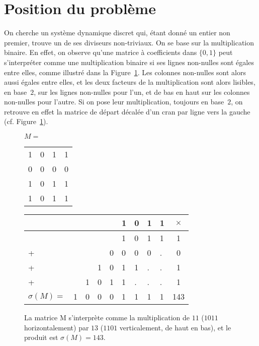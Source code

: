 \section{Position du problème}
\label{sec:introfacto}



On cherche un système dynamique discret qui, étant donné un entier non premier, trouve un de ses diviseurs non-triviaux. On se base sur la multiplication binaire. En effet, on observe qu'une matrice à coefficients dans $\{0,1\}$ peut s'interpréter comme une multiplication binaire si ses lignes non-nulles sont égales entre elles, comme illustré dans la Figure~\ref{fig:ExShift}. Les colonnes non-nulles sont alors aussi égales entre elles, et les deux facteurs de la multiplication sont alors lisibles, en base~$2$, sur les lignes non-nulles pour l'un, et de bas en haut sur les colonnes non-nulles pour l'autre. Si on pose leur multiplication, toujours en base~$2$, on retrouve en effet la matrice de départ décalée d'un cran par ligne vers la gauche (cf. Figure~\ref{fig:ExShift}).




\begin{figure}[h]
\centering
\begin{minipage}[]{0.25\linewidth}
$M=$
\begin{tabular}{cccc}
1&0&1&1\\
0&0&0&0\\
1&0&1&1\\
1&0&1&1\\
\end{tabular}

\end{minipage}
\quad
\begin{minipage}[]{0.4\linewidth}


\begin{tabular}{lllllllll|c}
&&&&&1&0&1&1&$\times$\\
\hline
&&&&&1&0&1&1&1\\
+&&&&0&0&0&0&.&0 \\
+&&&1&0&1&1&.&.&1\\
+&&1&0&1&1&.&.&.&1\\
\hline
$\sigma(M)=$&1&0&0&0&1&1&1&1&143\\
\end{tabular}
\end{minipage}
\caption{La matrice M s'interprète comme la multiplication de $11$ ($1011$ horizontalement) par $13$ ($1101$ verticalement, de haut en bas), et le produit est $\sigma(M)=143$.}
\label{fig:ExShift}
\end{figure}

